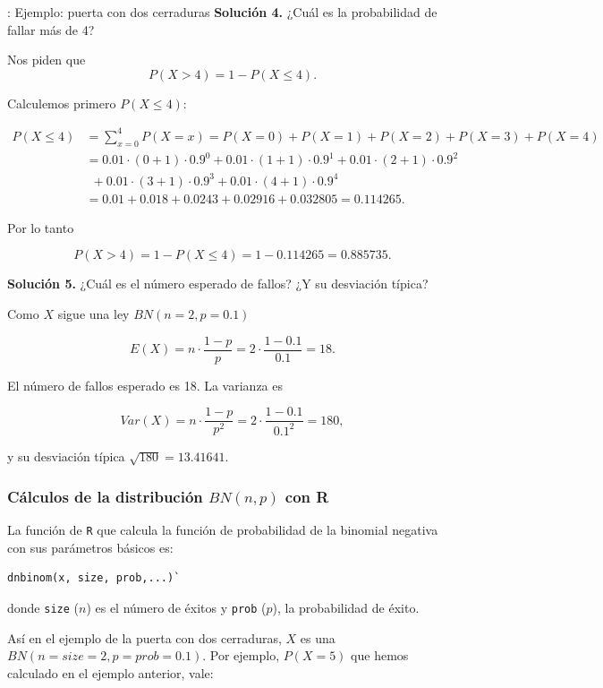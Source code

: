 \documentclass[
  letterpaper,
  DIV=11,
  numbers=noendperiod]{scrreprt}
\begin{document}
\begin{Ejemplo}{: Ejemplo: puerta con dos cerraduras}{}
\textbf{Solución 4.} ¿Cuál es la probabilidad de fallar más de 4?

Nos piden que \[
P(X>4)=1-P(X\leq 4).
\]

Calculemos primero \(P(X\leq 4):\)

\[
\begin{array}{rl}
P(X\leq 4) &= \displaystyle\sum_{x=0}^{4} P(X=x)=P(X=0)+P(X=1)+P(X=2)+P(X=3)+P(X=4)\\
&= 0.01\cdot (0+1) \cdot 0.9^{0}+0.01\cdot (1+1) \cdot 0.9^{1}+0.01\cdot (2+1) \cdot 0.9^{2} \\ &\ \ 
+0.01\cdot (3+1) \cdot 0.9^{3} + 0.01\cdot (4+1) \cdot 0.9^{4} \\ & =
0.01 +0.018+0.0243+0.02916+0.032805 = 0.114265.
\end{array}
\]

Por lo tanto

\[
P(X>4)=1-P(X\leq 4)=1-0.114265=
0.885735.
\]

\textbf{Solución 5.} ¿Cuál es el número esperado de fallos? ¿Y su
desviación típica?

Como \(X\) sigue una ley \(BN(n=2,p=0.1)\)

\[E(X)=n\cdot \frac{1-p}{p}=2\cdot \frac{1-0.1}{0.1}=18.\]

El número de fallos esperado es 18. La varianza es

\[
Var(X)=n\cdot\frac{1-p}{p^2}=2 \cdot \frac{1-0.1}{0.1^2}=180,
\]

y su desviación típica \(\sqrt{180}=13.41641.\)

\end{Ejemplo}

\subsubsection{\texorpdfstring{Cálculos de la distribución \(BN(n,p)\)
con
R}{Cálculos de la distribución BN(n,p) con R}}\label{cuxe1lculos-de-la-distribuciuxf3n-bnnp-con-r}

La función de \texttt{R} que calcula la función de probabilidad de la
binomial negativa con sus parámetros básicos es:

\begin{verbatim}
dnbinom(x, size, prob,...)`
\end{verbatim}

donde \texttt{size} (\(n\)) es el número de éxitos y \texttt{prob}
(\(p\)), la probabilidad de éxito.

Así en el ejemplo de la puerta con dos cerraduras, \(X\) es una
\(BN(n=size=2,p=prob=0.1)\). Por ejemplo, \(P(X=5)\) que hemos calculado
en el ejemplo anterior, vale:
\end{document}
